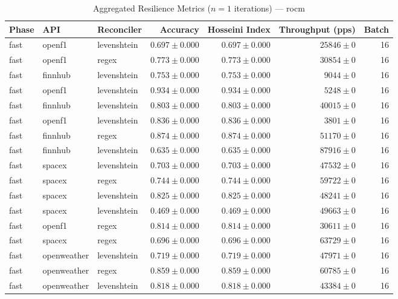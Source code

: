
\begin{table}[htbp]
\caption{Aggregated Resilience Metrics ($n=1$ iterations) --- rocm}
\begin{tabular}{l l l r r r r}
\hline
Phase & API & Reconciler & Accuracy & Hosseini Index & Throughput (pps) & Batch \\
\hline
fast & openf1 & levenshtein & $0.697\pm0.000$ & $0.697\pm0.000$ & $25846\pm0$ & 16 \\
fast & openf1 & regex & $0.773\pm0.000$ & $0.773\pm0.000$ & $30854\pm0$ & 16 \\
fast & finnhub & levenshtein & $0.753\pm0.000$ & $0.753\pm0.000$ & $9044\pm0$ & 16 \\
fast & openf1 & levenshtein & $0.934\pm0.000$ & $0.934\pm0.000$ & $5248\pm0$ & 16 \\
fast & finnhub & levenshtein & $0.803\pm0.000$ & $0.803\pm0.000$ & $40015\pm0$ & 16 \\
fast & openf1 & levenshtein & $0.836\pm0.000$ & $0.836\pm0.000$ & $3801\pm0$ & 16 \\
fast & finnhub & regex & $0.874\pm0.000$ & $0.874\pm0.000$ & $51170\pm0$ & 16 \\
fast & finnhub & levenshtein & $0.635\pm0.000$ & $0.635\pm0.000$ & $87916\pm0$ & 16 \\
fast & spacex & levenshtein & $0.703\pm0.000$ & $0.703\pm0.000$ & $47532\pm0$ & 16 \\
fast & spacex & regex & $0.744\pm0.000$ & $0.744\pm0.000$ & $59722\pm0$ & 16 \\
fast & spacex & levenshtein & $0.825\pm0.000$ & $0.825\pm0.000$ & $48241\pm0$ & 16 \\
fast & spacex & levenshtein & $0.469\pm0.000$ & $0.469\pm0.000$ & $49663\pm0$ & 16 \\
fast & openf1 & regex & $0.814\pm0.000$ & $0.814\pm0.000$ & $30611\pm0$ & 16 \\
fast & spacex & regex & $0.696\pm0.000$ & $0.696\pm0.000$ & $63729\pm0$ & 16 \\
fast & openweather & levenshtein & $0.719\pm0.000$ & $0.719\pm0.000$ & $47971\pm0$ & 16 \\
fast & openweather & regex & $0.859\pm0.000$ & $0.859\pm0.000$ & $60785\pm0$ & 16 \\
fast & openweather & levenshtein & $0.818\pm0.000$ & $0.818\pm0.000$ & $43384\pm0$ & 16 \\

\end{tabular}
\end{table}
